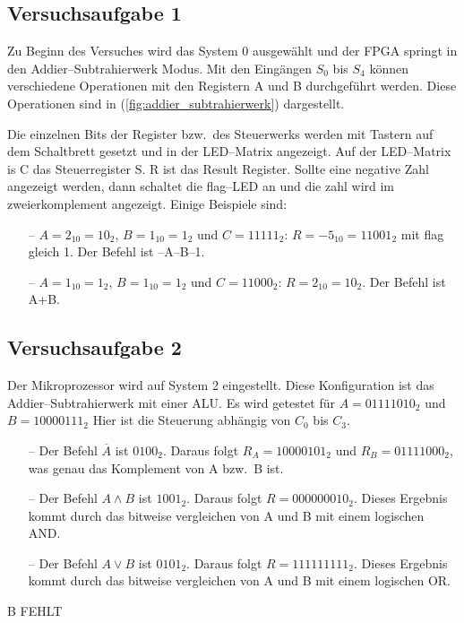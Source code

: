 \documentclass[10pt]{article}
\begin{document}
\begin{multicols}{2}
        \subsection{Versuchsaufgabe 1}
        Zu Beginn des Versuches wird das System 0 ausgewählt und der FPGA springt in den Addier--Subtrahierwerk Modus.
        Mit den Eingängen $S_0$ bis $S_4$ können verschiedene Operationen mit den Registern A und B durchgeführt werden.
        Diese Operationen sind in (\ref{fig:addier_subtrahierwerk}) dargestellt.
        \par Die einzelnen Bits der Register bzw.\ des Steuerwerks werden mit Tastern auf dem Schaltbrett gesetzt und in der LED--Matrix angezeigt.
        Auf der LED--Matrix is C das Steuerregister S.
        R ist das Result Register.
        Sollte eine negative Zahl angezeigt werden, dann schaltet die flag--LED an und die zahl wird im zweierkomplement angezeigt.
        Einige Beispiele sind:
        \begin{enumerate}
                \item[--] $A=2_{10}=10_{2}$, $B=1_{10}=1_2$ und $C=11111_{2}$: $R=-5_{10}=11001_2$ mit flag gleich 1.
                        Der Befehl ist --A--B--1.
                \item[--] $A=1_{10}=1_2$, $B=1_{10}=1_2$ und $C=11000_2$: $R=2_{10}=10_2$.
                        Der Befehl ist A+B.
        \end{enumerate}

        \subsection{Versuchsaufgabe 2}
        Der Mikroprozessor wird auf System 2 eingestellt.
        Diese Konfiguration ist das Addier--Subtrahierwerk mit einer ALU.
        Es wird getestet für $A=01111010_2$ und $B=10000111_2$ 
        Hier ist die Steuerung abhängig von $C_0$ bis $C_3$.
        \begin{enumerate}
                \item[--] Der Befehl $\overline{A}$ ist $0100_2$.
                        Daraus folgt $R_A=10000101_2$ und $R_B=01111000_2$, was genau das Komplement von A bzw.\ B ist.
                \item[--] Der Befehl $A\land B$ ist $1001_2$.
                        Daraus folgt $R=000000010_2$.
                        Dieses Ergebnis kommt durch das bitweise vergleichen von A und B mit einem logischen AND.
                \item[--] Der Befehl $A\lor B$ ist $0101_2$.
                        Daraus folgt $R=111111111_2$.
                        Dieses Ergebnis kommt durch das bitweise vergleichen von A und B mit einem logischen OR.
        \end{enumerate}
        B FEHLT


\end{multicols}
\end{document}

